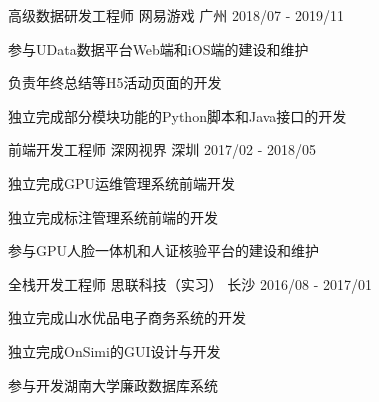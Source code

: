 \begin{cventries}
  \cventry
    {高级数据研发工程师}
    {网易游戏}
    {广州}
    {2018/07 - 2019/11}
    {
      \begin{cvitems}
        \item {参与UData数据平台Web端和iOS端的建设和维护}
        \item {负责年终总结等H5活动页面的开发}
        \item {独立完成部分模块功能的Python脚本和Java接口的开发}
      \end{cvitems}
    }
  \cventry
    {前端开发工程师}
    {深网视界}
    {深圳}
    {2017/02 - 2018/05}
    {
      \begin{cvitems}
        \item {独立完成GPU运维管理系统前端开发}
        \item {独立完成标注管理系统前端的开发}
        \item {参与GPU人脸一体机和人证核验平台的建设和维护}
      \end{cvitems}
    }
  \cventry
    {全栈开发工程师}
    {思联科技（实习）}
    {长沙}
    {2016/08 - 2017/01}
    {
      \begin{cvitems}
        \item {独立完成山水优品电子商务系统的开发}
        \item {独立完成OnSimi的GUI设计与开发}
        \item {参与开发湖南大学廉政数据库系统}
      \end{cvitems}
    }
\end{cventries}
